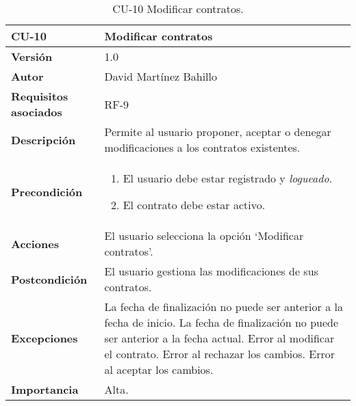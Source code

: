 \begin{table}[p]
	\centering
	\begin{tabularx}{\linewidth}{ p{} p{} }
		\toprule
		\textbf{CU-10}    & \textbf{Modificar contratos}\\
		\midrule
		\textbf{Versión}              & 1.0    \\
		\textbf{Autor}                & David Martínez Bahillo \\
		\textbf{Requisitos asociados} & RF-9 \\
		\textbf{Descripción}          & Permite al usuario proponer, aceptar o denegar modificaciones a los contratos existentes. \\
				\textbf{Precondición}         &  
		\begin{enumerate}
			\item El usuario debe estar registrado y \textit{logueado}.
			\item El contrato debe estar activo.
		\end{enumerate}\\
		\textbf{Acciones}             & El usuario selecciona la opción `Modificar contratos'. \\
		\textbf{Postcondición}        & El usuario gestiona las modificaciones de sus contratos. \\
		\textbf{Excepciones}          & La fecha de finalización no puede ser anterior a la fecha de inicio. La fecha de finalización no puede ser anterior a la fecha actual. Error al modificar el contrato. Error al rechazar los cambios. Error al aceptar los cambios. \\
		\textbf{Importancia}          & Alta. \\
		\bottomrule
	\end{tabularx}
	\caption{CU-10 Modificar contratos.}
\end{table}


